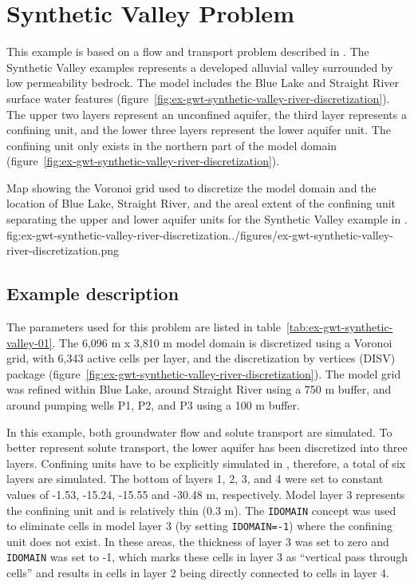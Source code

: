 \section{Synthetic Valley Problem}

This example is based on a flow and transport problem described in \cite{hughes2023flopy} .  The Synthetic Valley examples represents a developed alluvial valley surrounded by low permeability bedrock. The model includes the Blue Lake and Straight River surface water features (figure~\ref{fig:ex-gwt-synthetic-valley-river-discretization}). The upper two layers represent an unconfined aquifer, the third layer represents a confining unit, and the lower three layers represent the lower aquifer unit. The confining unit only exists in the northern part of the model domain (figure~\ref{fig:ex-gwt-synthetic-valley-river-discretization}).

\begin{StandardFigure}{
                                     Map showing the Voronoi grid used to discretize the model domain and the location of Blue Lake, Straight River, and the areal extent of the confining unit separating the upper and lower aquifer units for the Synthetic Valley example in \cite{hughes2023flopy}.
                                     }{fig:ex-gwt-synthetic-valley-river-discretization}{../figures/ex-gwt-synthetic-valley-river-discretization.png}
\end{StandardFigure}                                 

\subsection{Example description}

The parameters used for this problem are listed in table~\ref{tab:ex-gwt-synthetic-valley-01}. The 6,096 m x 3,810 m model domain is discretized using a Voronoi grid, with 6,343 active cells per layer, and the discretization by vertices (DISV) package (figure~\ref{fig:ex-gwt-synthetic-valley-river-discretization}). The model grid was refined within Blue Lake, around Straight River using a 750 m buffer, and around pumping wells P1, P2, and P3 using a 100 m buffer.

In this example, both groundwater flow \citep{modflow6gwf} and solute transport \citep{modflow6gwt} are simulated. To better represent solute transport, the lower aquifer has been discretized into three layers. Confining units have to be explicitly simulated in \mf, therefore, a total of six layers are simulated. The bottom of layers 1, 2, 3, and 4 were set to constant values of -1.53, -15.24, -15.55 and -30.48 m, respectively. Model layer 3 represents the confining unit and is relatively thin (0.3 m). The \texttt{IDOMAIN} concept \citep{modflow6gwf} was used to eliminate cells in model layer 3 (by setting \texttt{IDOMAIN=-1}) where the confining unit does not exist. In these areas, the thickness of layer 3 was set to zero and \texttt{IDOMAIN} was set to -1, which marks these cells in layer 3 as ``vertical pass through cells'' and results in cells in layer 2 being directly connected to cells in layer 4.  

